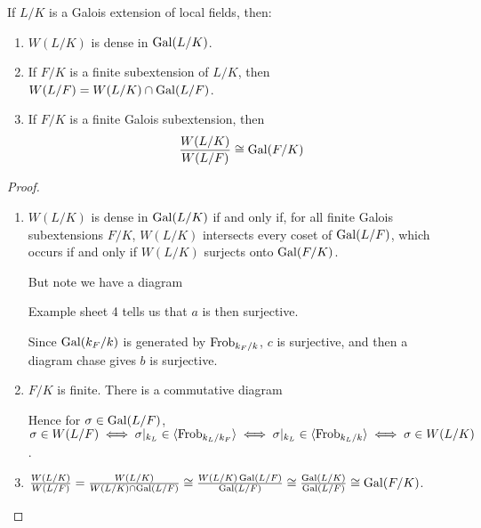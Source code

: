 \documentclass[10pt,a4paper]{article}
\begin{document}
\begin{proposition}
  If $L/K$ is a Galois extension of local fields, then:
  \begin{enumerate}
    \item $W(L/K)$ is dense in $\operatorname{Gal}(L/K)$.
    \item If $F/K$ is a finite subextension of $L/K$, then $W(L/F) = W(L/K)\cap \operatorname{Gal}(L/F)$.
    \item If $F/K$ is a finite Galois subextension, then
    \[\frac{W(L/K)}{W(L/F)} \cong \operatorname{Gal}(F/K)\]
  \end{enumerate}
\end{proposition}
\begin{proof}\hspace*{0cm}
  \begin{enumerate}
    \item $W(L/K)$ is dense in $\operatorname{Gal}(L/K)$ if and only if, for all finite Galois subextensions $F/K$, $W(L/K)$ intersects every coset of $\operatorname{Gal}(L/F)$, which occurs if and only if $W(L/K)$ surjects onto $\operatorname{Gal}(F/K)$.

    But note we have a diagram
    \begin{center}
    \end{center}
    Example sheet 4 tells us that $a$ is then surjective.

    Since $\operatorname{Gal}(k_F/k)$ is generated by $\operatorname{Frob}_{k_F/k}$, $c$ is surjective, and then a diagram chase gives $b$ is surjective.

    \item $F/K$ is finite. There is a commutative diagram
    \begin{center}
    \end{center}
    Hence for $\sigma \in \operatorname{Gal}(L/F)$, $\sigma \in W(L/F) \iff \sigma|_{k_L} \in \langle \operatorname{Frob}_{k_L/k_F} \rangle \iff \sigma|_{k_L} \in \langle \operatorname{Frob}_{k_L/k} \rangle \iff \sigma \in W(L/K)$.

    \item $\frac{W(L/K)}{W(L/F)} = \frac{W(L/K)}{W(L/K)\cap \operatorname{Gal}(L/F)} \cong \frac{W(L/K)\operatorname{Gal}(L/F)}{\operatorname{Gal}(L/F)} \cong \frac{\operatorname{Gal}(L/K)}{\operatorname{Gal}(L/F)} \cong \operatorname{Gal}(F/K)$.
  \end{enumerate}
\end{proof}
\end{document}
